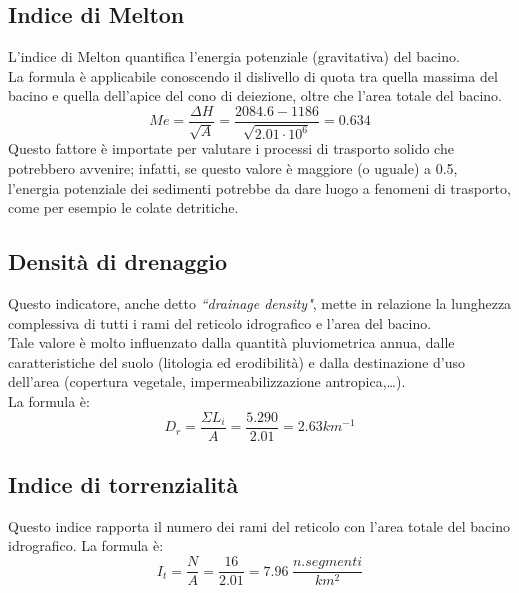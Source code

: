 \subsection{Indice di Melton}
L'indice di Melton quantifica l'energia potenziale (gravitativa) del bacino.\\
La formula è applicabile conoscendo il dislivello di quota tra quella massima del bacino e quella dell'apice del cono di deiezione, oltre che l'area totale del bacino. 
\begin{equation}
    Me = \frac{\Delta H}{\sqrt{A}} = \frac{2084.6-1186}{\sqrt{2.01 \cdot 10^6}} = 0.634
    \label{melton}
\end{equation}
Questo fattore è importate per valutare i processi di trasporto solido che potrebbero avvenire; infatti, se questo valore è maggiore (o uguale) a 0.5, l'energia potenziale dei sedimenti potrebbe da dare luogo a fenomeni di trasporto, come per esempio le colate detritiche.

\subsection{Densità di drenaggio}
Questo indicatore, anche detto \textit{``drainage density"}, mette in relazione la lunghezza complessiva di tutti i rami del reticolo idrografico e l'area del bacino.\\
Tale valore è molto influenzato dalla quantità pluviometrica annua, dalle caratteristiche del suolo (litologia ed erodibilità) e dalla destinazione d'uso dell'area (copertura vegetale, impermeabilizzazione antropica,\dots).\\
La formula è:
\begin{equation}
    D_r = \frac{\Sigma L_i}{A} = \frac{5.290}{2.01} = 2.63 km^{-1}
    \label{drenaggio}
\end{equation}

\subsection{Indice di torrenzialità}
Questo indice rapporta il numero dei rami del reticolo con l'area totale del bacino idrografico.
La formula è:
\begin{equation}
I_t = \frac{N}{A} = \frac{16}{2.01} = 7.96 \hspace{3pt}\frac{n. segmenti}{km^2} 
\label{torrenzialità}
\end{equation}

